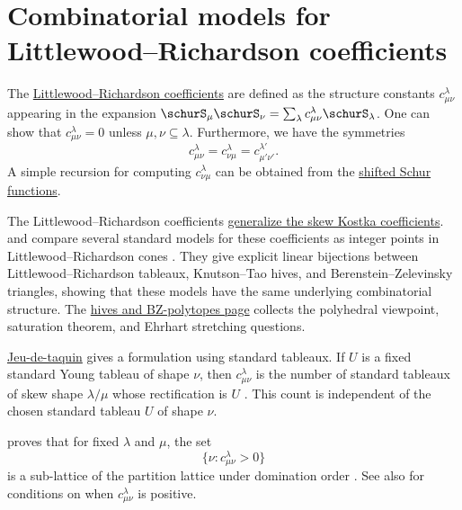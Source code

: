 


\section[littlewoodRichardsonModels]{Combinatorial models for Littlewood--Richardson coefficients}

The \hyperref[schurLittlewoodRichardson]{Littlewood--Richardson coefficients}
are defined as the structure constants $c^{\lambda}_{\mu\nu}$ appearing in the
expansion
$\schurS_\mu \schurS_\nu =
\sum_\lambda c^{\lambda}_{\mu\nu} \schurS_\lambda$.
One can show that $c^{\lambda}_{\mu\nu}=0$ unless $\mu,\nu \subseteq \lambda$.
Furthermore, we have the symmetries
\[
c^{\lambda}_{\mu\nu} = c^{\lambda}_{\nu\mu} = c^{\lambda'}_{\mu'\nu'}.
\]
A simple recursion for computing $c^{\lambda}_{\nu\mu}$
can be obtained from the \hyperref[schurShiftedLittlewoodRichardson]{shifted Schur functions}.

The Littlewood--Richardson coefficients \hyperref[kostkaFromLR]{generalize the skew Kostka coefficients}.
 and  compare several standard models
for these coefficients as integer points in Littlewood--Richardson cones
\cite{PakVallejo2005}.  They give explicit linear bijections between
Littlewood--Richardson tableaux, Knutson--Tao hives, and
Berenstein--Zelevinsky triangles, showing that these models have the same
underlying combinatorial structure.
The \hyperref[hivePolytopes]{hives and BZ-polytopes page} collects the
polyhedral viewpoint, saturation theorem, and Ehrhart stretching questions.

\hyperref[jeuDeTaquinOperation]{Jeu-de-taquin} gives a formulation using
standard tableaux.  If $U$ is a fixed standard Young tableau of shape $\nu$,
then $c^\lambda_{\mu\nu}$ is the number of standard tableaux of skew shape
$\lambda/\mu$ whose rectification is $U$ \cite[Sec.~5]{Fulton1997}.  This
count is independent of the chosen standard tableau $U$ of shape $\nu$.


 proves that for fixed $\lambda$ and $\mu$, the set
\[
 \{ \nu : c^{\lambda}_{\mu \nu}>0 \}
\]
is a sub-lattice of the partition lattice under domination order
\cite{Azenhas1999}.
See also \cite{TaskinGumus2022x} for conditions on when
$c^{\lambda}_{\mu \nu}$ is positive.


